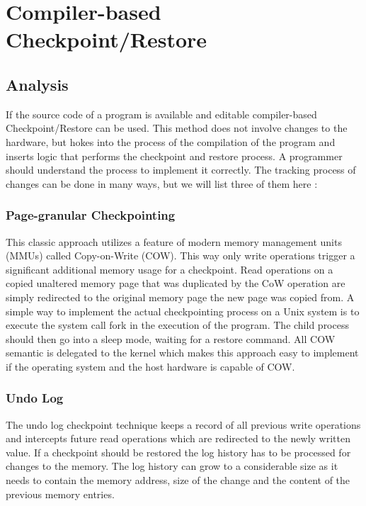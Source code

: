 \section{Compiler-based Checkpoint/Restore}
\subsection{Analysis}
If the source code of a program is available and editable
compiler-based Checkpoint/Restore can be used. This method
does not involve changes to the hardware, but hokes into the
process of the compilation of the program and inserts logic
that performs the checkpoint and restore process. A programmer
should understand the process to implement it correctly.
The tracking process of changes can be done in many ways,
but we will list three of them here \cite{vogt_compiler_cr}:

\subsubsection{Page-granular Checkpointing}
This classic approach utilizes a feature of modern 
memory management units (MMUs) called
Copy-on-Write (COW). This way only write operations trigger
a significant additional memory usage for a checkpoint.
Read operations on a copied unaltered memory page that was duplicated by
the CoW operation are simply redirected to the original memory page
the new page was copied from.
A simple way to implement the actual checkpointing process on
a Unix system is to execute the system call fork in the execution
of the program. The child process should then go into a sleep mode,
waiting for a restore command. All COW semantic is delegated to the
kernel which makes this approach easy to implement if the operating
system and the host hardware is capable of COW.

\subsubsection{Undo Log}
The undo log checkpoint technique keeps a record of all previous
write operations and intercepts future read operations which are
redirected to the newly written value. If a checkpoint should be
restored the log history has to be processed for changes to
the memory. The log history can grow to a considerable size as it
needs to contain the memory address, size of the change and the
content of the previous memory entries.

